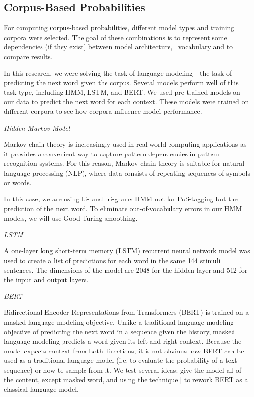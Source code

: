 \documentclass[a4paper]{article}
\newcommand{\head}[1]{\vspace{0.5em}\emph{#1}\vspace{0.25em}}
\begin{document}
\subsection{Corpus-Based Probabilities}

For computing сorpus-based probabilities, different model types and training corpora were selected. The goal of these combinations is to represent some dependencies (if they exist) between model architecture,  vocabulary and to compare results.

In this research, we were solving the task of language modeling - the task of predicting the next word given the corpus. 
Several models perform well of this task type, including HMM, LSTM, and BERT. We used pre-trained models on our data to predict the next word for each context. These models were trained on different corpora to see how corpora influence model performance.

\head{Hidden Markov Model}

Markov chain theory is increasingly used in real-world computing applications as it provides a convenient way to capture pattern dependencies in pattern recognition systems. For this reason, Markov chain theory is suitable for natural language processing (NLP), where data consists of repeating sequences of symbols or words. 

In this case, we are using bi- and tri-grams HMM not for PoS-tagging but the prediction of the next word. To eliminate out-of-vocabulary errors in our HMM models, we will use Good-Turing smoothing.

\head{LSTM}

A one-layer long short-term memory (LSTM) recurrent neural network model was used \cite{jozefowicz:2016} to create a list of predictions for each word in the same 144 stimuli sentences. The dimensions of the model are 2048 for the hidden layer and 512 for the input and output layers. 

\head{BERT}

Bidirectional Encoder Representations from Transformers
(BERT) \cite{bert} is trained on a masked language modeling objective. Unlike a traditional language modeling objective of predicting the next word in a sequence given the history, masked language modeling predicts a word given its left and right context. Because the model expects context from both directions, it is not obvious how BERT can be used as a traditional language model (i.e. to evaluate the probability of a text sequence) or how to sample from it. We test several ideas: give the model all of the content, except masked word, and using the technique[] to rework BERT as a classical language model.
\end{document}
